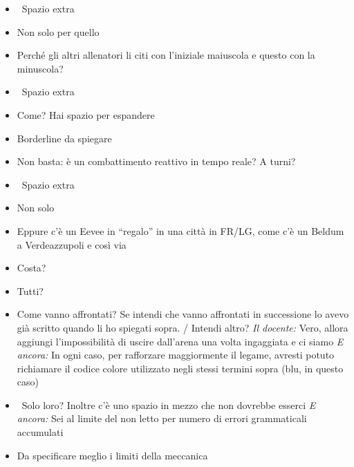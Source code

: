 {\begin{itemize}
  \item \rvVuoto\ Spazio extra
  \item {} Non solo per quello
  \item {} Perché gli altri allenatori li citi con l'iniziale maiuscola e questo con la minuscola?
  \item \rvVuoto\ Spazio extra
  \item {} Come? Hai spazio per espandere
  \item {} Borderline da spiegare
  \item {} Non basta: è un combattimento reattivo in tempo reale? A turni?
  \item \rvVuoto\ Spazio extra
  \item {} Non solo
  \item {} Eppure c'è un Eevee in ``regalo'' in una città in FR/LG, come c'è un Beldum a Verdeazzupoli e così via
  \item {} Costa?
  \item {} Tutti?
  \item {} Come vanno affrontati?  Se intendi che vanno affrontati in successione lo avevo già scritto quando li ho spiegati sopra. / Intendi altro? \emph{Il docente:} Vero, allora aggiungi l'impossibilità di uscire dall'arena una volta ingaggiata e ci siamo \emph{E ancora:} In ogni caso, per rafforzare maggiormente il legame, avresti potuto richiamare il codice colore utilizzato negli stessi termini sopra (blu, in questo caso)
  \item {} \rvAvviso\ Solo loro? Inoltre c'è uno spazio in mezzo che non dovrebbe esserci \emph{E ancora:} Sei al limite del non letto per numero di errori grammaticali accumulati
  \item {} Da specificare meglio i limiti della meccanica
\end{itemize}
}

